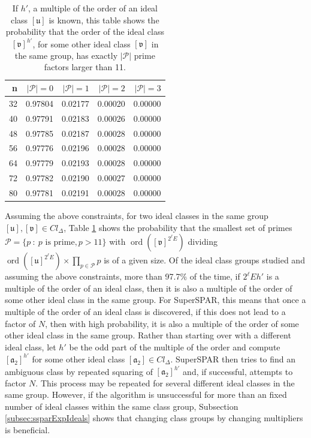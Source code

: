 \documentclass{ucalgthes1}
\theoremstyle{definition}
\DeclareMathOperator{\ord}{ord}
\newcommand{\set}{\mathcal}
\newcommand{\ideal}{\mathfrak}
\newcommand{\idealclass}[1]{\left[ \ideal #1 \right]}
\begin{document}
\begin{table}[htb]
\centering
\begin{tabular}{| r | r | r | r | r |}
	\hline
	n & $|\set P| = 0$ & $|\set P| = 1$ & $|\set P| = 2$ & $|\set P| = 3$ \\
	\hline
32 & 0.97804 & 0.02177 & 0.00020 & 0.00000 \\
40 & 0.97791 & 0.02183 & 0.00026 & 0.00000 \\
48 & 0.97785 & 0.02187 & 0.00028 & 0.00000 \\
56 & 0.97776 & 0.02196 & 0.00028 & 0.00000 \\
64 & 0.97779 & 0.02193 & 0.00028 & 0.00000 \\
72 & 0.97782 & 0.02190 & 0.00027 & 0.00000 \\
80 & 0.97781 & 0.02191 & 0.00028 & 0.00000 \\
	\hline
\end{tabular}
\caption[Probability that $\idealclass v^{h'}$ has $|\mathcal P|$ factors.]{If $h'$, a multiple of the order of an ideal class $\idealclass u$ is known, this table shows the probability that the order of the ideal class ${\idealclass v}^{h'}$, for some other ideal class $\idealclass v$ in the same group, has exactly $|\set P|$ prime factors larger than 11.}
\label{tab:diffOfOrderOfTwoIdeals}
\end{table}

Assuming the above constraints, for two ideal classes in the same group $\idealclass u, \idealclass v \in Cl_\Delta$, Table \ref{tab:diffOfOrderOfTwoIdeals} shows the probability that the smallest set of primes $\set P = \{ p ~:~ p \textrm{ is prime}, p > 11 \}$ with $\ord({\idealclass v}^{2^\ell E})$ dividing $\ord({\idealclass u}^{2^\ell E}) \times \prod_{p \in \set P} p$ is of a given size.  Of the ideal class groups studied and assuming the above constraints, more than 97.7\% of the time, if $2^\ell Eh'$ is a multiple of the order of an ideal class, then it is also a multiple of the order of some other ideal class in the same group.  For SuperSPAR, this means that once a multiple of the order of an ideal class is discovered, if this does not lead to a factor of $N$, then with high probability, it is also a multiple of the order of some other ideal class in the same group.  Rather than starting over with a different ideal class, let $h'$ be the odd part of the multiple of the order and compute $\idealclass{a_2}^{h'}$ for some other ideal class $\idealclass{a_2} \in Cl_\Delta$.  SuperSPAR then tries to find an ambiguous class by repeated squaring of $\idealclass{a_2}^{h'}$ and, if successful, attempts to factor $N$.  This process may be repeated for several different ideal classes in the same group.  However, if the algorithm is unsuccessful for more than an fixed number of ideal classes within the same class group, Subsection \ref{subsec:ssparExpIdeals} shows that changing class groups by changing multipliers is beneficial.
\end{document}
